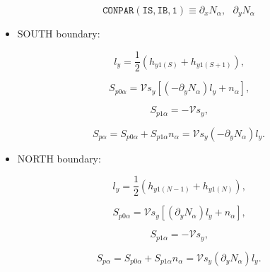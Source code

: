 \documentclass[11pt]{article}
\begin{document}
\bigskip

\begin{equation*}
\mathtt{CONPAR(IS,IB,1)}\equiv\partial_{x}N_{\alpha},\text{ }\partial
_{y}N_{\alpha}
\end{equation*}

\bigskip

\begin{itemize}
\item  SOUTH boundary:
\end{itemize}

\begin{equation}
l_{y}=\frac{1}{2}\left( h_{y1(S)}+h_{y1(S+1)}\right) \text{,}   \label{c14}
\end{equation}

\begin{equation}
S_{p0\alpha}=\mathcal{V}s_{y}\left[ \left( -\partial_{y}N_{\alpha}\right)
l_{y}+n_{\alpha}\right] \text{,}   \label{c15}
\end{equation}

\begin{equation}
S_{p1\alpha}=-\mathcal{V}s_{y}\text{,}   \label{c16}
\end{equation}

\begin{equation}
S_{p\alpha}=S_{p0\alpha}+S_{p1\alpha}n_{\alpha}=\mathcal{V}s_{y}\left(
-\partial_{y}N_{\alpha}\right) l_{y}\text{.}   \label{c17}
\end{equation}

\begin{itemize}
\item  NORTH boundary:
\end{itemize}

\begin{equation}
l_{y}=\frac{1}{2}\left( h_{y1(N-1)}+h_{y1(N)}\right) \text{,}   \label{c18}
\end{equation}

\begin{equation}
S_{p0\alpha}=\mathcal{V}s_{y}\left[ \left( \partial_{y}N_{\alpha}\right)
l_{y}+n_{\alpha}\right] \text{,}   \label{c19}
\end{equation}

\begin{equation}
S_{p1\alpha}=-\mathcal{V}s_{y}\text{,}   \label{c20}
\end{equation}

\begin{equation}
S_{p\alpha}=S_{p0\alpha}+S_{p1\alpha}n_{\alpha}=\mathcal{V}s_{y}\left(
\partial_{y}N_{\alpha}\right) l_{y}\text{.}   \label{c21}
\end{equation}
\end{document}
